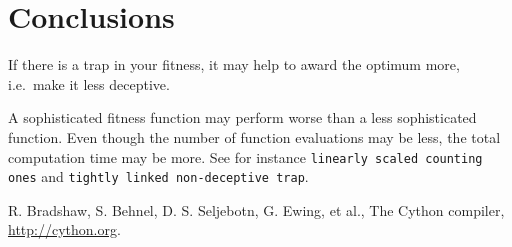 \documentclass[12pt]{article}
\theoremstyle{definition}
\newcommand{\lsco}{\texttt{linearly scaled counting ones}}
\newcommand{\tnt}{\texttt{tightly linked non-deceptive trap}}
\begin{document}
\section{Conclusions}

If there is a trap in your fitness, it may help to award the optimum more,
i.e.\ make it less deceptive.

A sophisticated fitness function may perform worse than a less sophisticated function.
Even though the number of function evaluations may be less, the total computation time
may be more. See for instance \lsco{} and \tnt{}.

\begin{thebibliography}{9}

R. Bradshaw, S. Behnel, D. S. Seljebotn, G. Ewing, et al.,
The Cython compiler, \url{http://cython.org}.

\end{thebibliography}
\end{document}

